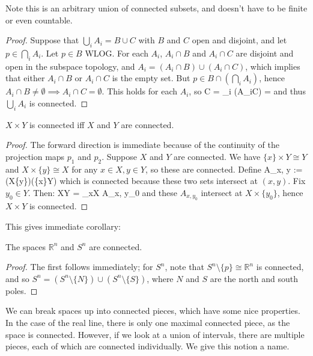 	Note this is an arbitrary union of connected subsets, and doesn't have to be finite or even countable. 
	
	\begin{proof}
		Suppose that $\bigcup_i A_i = B\cup C$ with $B$ and $C$ open and disjoint, and let $p\in\bigcap_i A_i$. Let $p\in B$ WLOG. For each $A_i$, 
		$A_i\cap B$ and $A_i\cap C$ are disjoint and open in the subspace topology, and $A_i = (A_i\cap B)\cup (A_i\cap C)$, which implies that either 
		$A_i\cap B$ or $A_i\cap C$ is the empty set. But $p\in B\cap(\bigcap_i A_i)$, hence $A_i\cap B\neq\emptyset\implies A_i\cap C = \emptyset$. 
		This holds for each $A_i$, so
		\eq
			C = \bigcup_i (A_i\cap C) = \emptyset
		\qe
		and thus $\bigcup_i A_i$ is connected.
	\end{proof}
	
	\begin{theorem}
		$X\times Y$ is connected iff $X$ and $Y$ are connected.
	\end{theorem}
	
	\begin{proof}
		The forward direction is immediate because of the continuity of the projection maps $p_1$ and $p_2$. Suppose $X$ and $Y$ are connected. We 
		have $\{x\}\times Y\cong Y$ and $X\times\{y\}\cong X$ for any $x\in X, y\in Y$, so these are connected. Define 
		\eq
			A_{x, y} := (X\times \{y\})\cup (\{x\}\times Y)
		\qe
		which is connected because these two sets intersect at $(x, y)$. Fix $y_0\in Y$. Then:
		\eq
			X\times Y = \bigcup_{x\in X} A_{x, y_0}
		\qe
		and these $A_{x, y_0}$ intersect at $X\times \{y_0\}$, hence $X\times Y$ is connected.
	\end{proof}
	
	This gives immediate corollary:
	\begin{corollary}
		The spaces $\mathbb R^n$ and $S^n$ are connected.
	\end{corollary}
	
	\begin{proof}
		The first follows immediately; for $S^n$, note that $S^n\setminus\{p\}\cong\mathbb R^n$ is connected, and so $S^n = (S^n\setminus\{N\})\cup(S^n
		\setminus\{S\})$, where $N$ and $S$ are the north and south poles.
	\end{proof}
	
	We can break spaces up into connected pieces, which have some nice properties. In the case of the real line, there is only one maximal connected piece, 
	as the space is connected. However, if we look at a union of intervals, there are multiple pieces, each of which are connected individually. We give this 
	notion a name.
	
